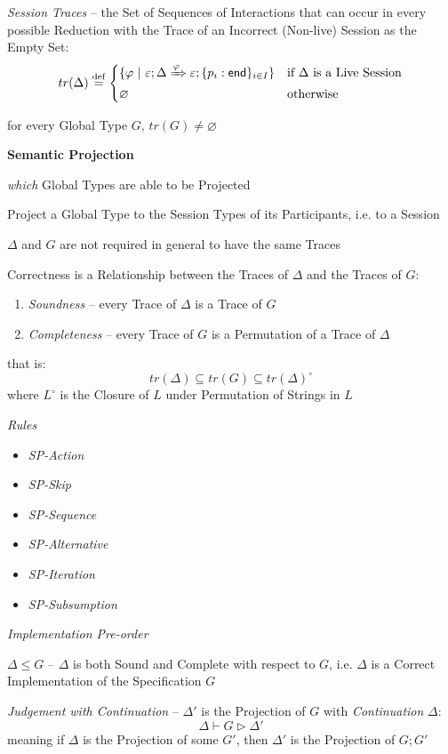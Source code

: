 \emph{Session Traces} -- the Set of Sequences of Interactions that can
occur in every possible Reduction with the Trace of an Incorrect
(Non-live) Session as the Empty Set:
\[
  tr(\Delta) \stackrel{\mathrm{def}}=
    \begin{cases}
      \{ \varphi \ |\ \varepsilon ;
        \Delta \xRightarrow{\varphi} \varepsilon;
        \{ p_i : \mathsf{end} \}_{i \in I} \}
        & \text{if} \ \Delta\ \text{is a Live Session} \\
      \varnothing & \text{otherwise}
    \end{cases}
\]

for every Global Type $G$, $tr(G) \neq \varnothing$


\textbf{Semantic Projection}

\emph{which} Global Types are able to be Projected

Project a Global Type to the Session Types of its Participants, i.e.
to a Session

$\Delta$ and $G$ are not required in general to have the same Traces

Correctness is a Relationship between the Traces of $\Delta$ and the
Traces of $G$:
\begin{enumerate}
  \item \emph{Soundness} -- every Trace of $\Delta$ is a Trace of $G$
  \item \emph{Completeness} -- every Trace of $G$ is a Permutation of
    a Trace of $\Delta$
\end{enumerate}
that is:
\[
  tr(\Delta) \subseteq tr(G) \subseteq tr(\Delta)^\circ
\]
where $L^\circ$ is the Closure of $L$ under Permutation of Strings in
$L$

\emph{Rules}
\begin{itemize}
  \item \emph{SP-Action}
  \item \emph{SP-Skip}
  \item \emph{SP-Sequence}
  \item \emph{SP-Alternative}
  \item \emph{SP-Iteration}
  \item \emph{SP-Subsumption}
\end{itemize}

\emph{Implementation Pre-order}

$\Delta \leq G$ -- $\Delta$ is both Sound and Complete with respect to
$G$, i.e. $\Delta$ is a Correct Implementation of the Specification
$G$

\emph{Judgement with Continuation} -- $\Delta'$ is the Projection of
$G$ with \emph{Continuation} $\Delta$:
\[
  \Delta \vdash G \rhd \Delta'
\]
meaning if $\Delta$ is the Projection of some $G'$, then $\Delta'$ is
the Projection of $G;G'$

